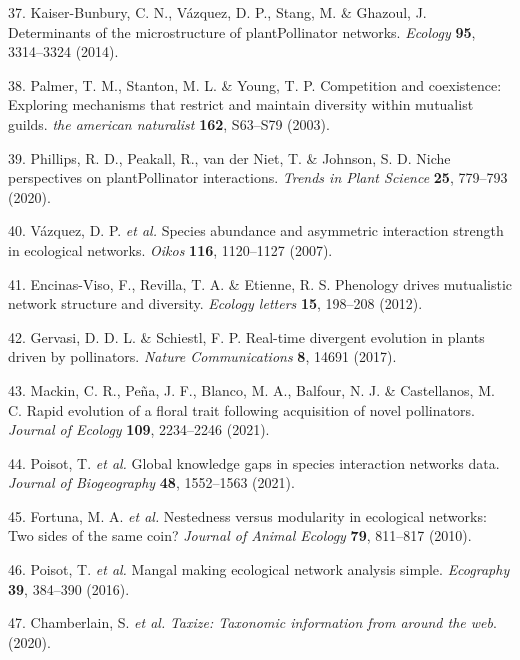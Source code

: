 \documentclass[12pt,a4paper,]{article}
\begin{document}
\hypertarget{ref-kaiser2014}{}
37. Kaiser-Bunbury, C. N., Vázquez, D. P., Stang, M. \& Ghazoul, J.
Determinants of the microstructure of plantPollinator networks.
\emph{Ecology} \textbf{95}, 3314--3324 (2014).

\hypertarget{ref-palmer2003}{}
38. Palmer, T. M., Stanton, M. L. \& Young, T. P. Competition and
coexistence: Exploring mechanisms that restrict and maintain diversity
within mutualist guilds. \emph{the american naturalist} \textbf{162},
S63--S79 (2003).

\hypertarget{ref-phillips2020}{}
39. Phillips, R. D., Peakall, R., van der Niet, T. \& Johnson, S. D.
Niche perspectives on plantPollinator interactions. \emph{Trends in
Plant Science} \textbf{25}, 779--793 (2020).

\hypertarget{ref-vazquez2007}{}
40. Vázquez, D. P. \emph{et al.} Species abundance and asymmetric
interaction strength in ecological networks. \emph{Oikos} \textbf{116},
1120--1127 (2007).

\hypertarget{ref-encinas2012}{}
41. Encinas-Viso, F., Revilla, T. A. \& Etienne, R. S. Phenology drives
mutualistic network structure and diversity. \emph{Ecology letters}
\textbf{15}, 198--208 (2012).

\hypertarget{ref-gervasi2017}{}
42. Gervasi, D. D. L. \& Schiestl, F. P. Real-time divergent evolution
in plants driven by pollinators. \emph{Nature Communications}
\textbf{8}, 14691 (2017).

\hypertarget{ref-mackin2021}{}
43. Mackin, C. R., Peña, J. F., Blanco, M. A., Balfour, N. J. \&
Castellanos, M. C. Rapid evolution of a floral trait following
acquisition of novel pollinators. \emph{Journal of Ecology}
\textbf{109}, 2234--2246 (2021).

\hypertarget{ref-poisot2021}{}
44. Poisot, T. \emph{et al.} Global knowledge gaps in species
interaction networks data. \emph{Journal of Biogeography} \textbf{48},
1552--1563 (2021).

\hypertarget{ref-fortuna2010}{}
45. Fortuna, M. A. \emph{et al.} Nestedness versus modularity in
ecological networks: Two sides of the same coin? \emph{Journal of Animal
Ecology} \textbf{79}, 811--817 (2010).

\hypertarget{ref-poisot2016}{}
46. Poisot, T. \emph{et al.} Mangal making ecological network analysis
simple. \emph{Ecography} \textbf{39}, 384--390 (2016).

\hypertarget{ref-chamberlain2020}{}
47. Chamberlain, S. \emph{et al.} \emph{Taxize: Taxonomic information
from around the web}. (2020).
\end{document}
